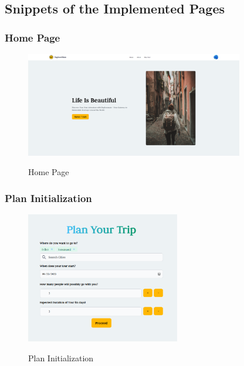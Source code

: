 \documentclass[12pt]{article}
\begin{document}
\subsection{Snippets of the Implemented Pages}
\subsubsection{Home Page}
\begin{figure}[H]
    \centering
        \includegraphics[width=0.85\textwidth]{Frontend SS/Home.png}
        \label{fig:HomePage}
    \caption{Home Page}
\end{figure}

\subsubsection{Plan Initialization}
\begin{figure}[H]
    \centering
        \includegraphics[width=0.60\textwidth]{Frontend SS/Plan Trip.png}
        \label{fig:PlanTrip}
    \caption{Plan Initialization}
\end{figure}

\newpage
\end{document}
